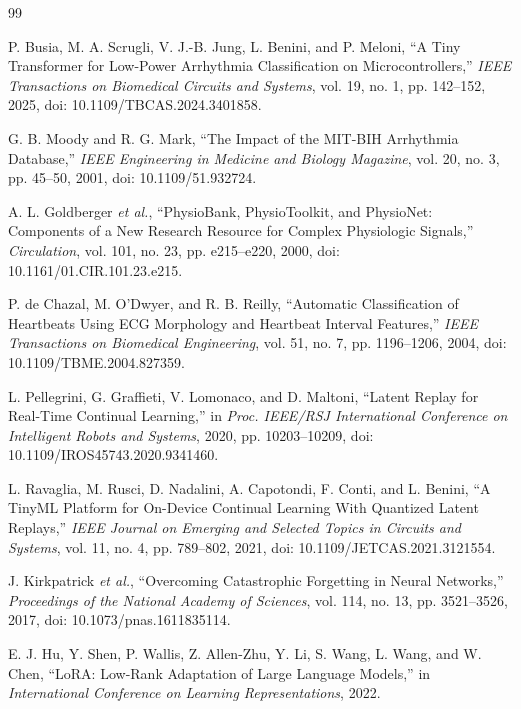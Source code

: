 \begin{thebibliography}{99}

P. Busia, M. A. Scrugli, V. J.-B. Jung, L. Benini, and P. Meloni,
``A Tiny Transformer for Low-Power Arrhythmia Classification on
Microcontrollers,'' \emph{IEEE Transactions on Biomedical Circuits and
Systems}, vol. 19, no. 1, pp. 142--152, 2025,
doi: 10.1109/TBCAS.2024.3401858.

G. B. Moody and R. G. Mark,
``The Impact of the MIT-BIH Arrhythmia Database,''
\emph{IEEE Engineering in Medicine and Biology Magazine},
vol. 20, no. 3, pp. 45--50, 2001,
doi: 10.1109/51.932724.

A. L. Goldberger \emph{et al.},
``PhysioBank, PhysioToolkit, and PhysioNet: Components of a New Research
Resource for Complex Physiologic Signals,''
\emph{Circulation}, vol. 101, no. 23, pp. e215--e220, 2000,
doi: 10.1161/01.CIR.101.23.e215.

P. de Chazal, M. O'Dwyer, and R. B. Reilly,
``Automatic Classification of Heartbeats Using ECG Morphology and Heartbeat
Interval Features,''
\emph{IEEE Transactions on Biomedical Engineering},
vol. 51, no. 7, pp. 1196--1206, 2004,
doi: 10.1109/TBME.2004.827359.

L. Pellegrini, G. Graffieti, V. Lomonaco, and D. Maltoni,
``Latent Replay for Real-Time Continual Learning,''
in \emph{Proc. IEEE/RSJ International Conference on Intelligent Robots and
Systems}, 2020, pp. 10203--10209,
doi: 10.1109/IROS45743.2020.9341460.

L. Ravaglia, M. Rusci, D. Nadalini, A. Capotondi, F. Conti, and L. Benini,
``A TinyML Platform for On-Device Continual Learning With Quantized Latent
Replays,''
\emph{IEEE Journal on Emerging and Selected Topics in Circuits and Systems},
vol. 11, no. 4, pp. 789--802, 2021,
doi: 10.1109/JETCAS.2021.3121554.

J. Kirkpatrick \emph{et al.},
``Overcoming Catastrophic Forgetting in Neural Networks,''
\emph{Proceedings of the National Academy of Sciences},
vol. 114, no. 13, pp. 3521--3526, 2017,
doi: 10.1073/pnas.1611835114.

E. J. Hu, Y. Shen, P. Wallis, Z. Allen-Zhu, Y. Li, S. Wang, L. Wang,
and W. Chen,
``LoRA: Low-Rank Adaptation of Large Language Models,''
in \emph{International Conference on Learning Representations}, 2022.


\end{thebibliography}
